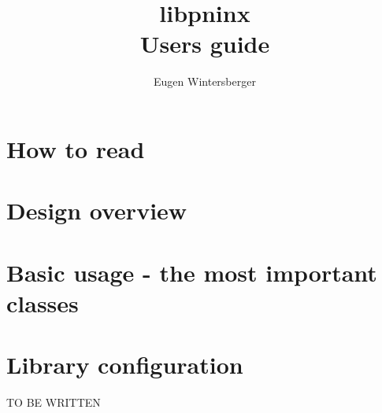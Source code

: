 \documentclass[a4paper,twoside]{book}
\author{Eugen Wintersberger}
\title{{\Huge libpninx\\ Users guide}}
\begin{document}
\maketitle
\tableofcontents

\chapter{How to read}\label{chapter:how_to_read}

\chapter{Design overview}\label{chapter:design_overview}


\chapter{Basic usage - the most important classes}\label{chapter:basic_usage}


\chapter{Library configuration}
TO BE WRITTEN

\newpage
{}


\end{document}

